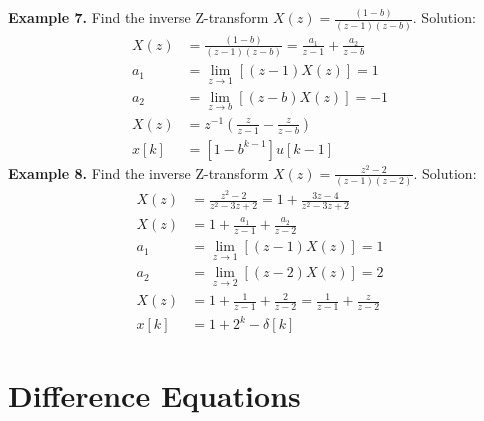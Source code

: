 \documentclass[twoside]{article}
\begin{document}
%
\textbf{Example 7.} Find the  inverse Z-transform $X(z) =
\frac{(1-b)}{(z-1) (z-b)}$. Solution:
%
\begin{align*}
    X(z) &= \frac{(1-b)}{(z-1) (z-b)} = \frac{a_1}{z-1} + 
                     \frac{a_2}{z-b} \\
    a_1 &= \lim_{z \to 1} \left[ (z - 1) X(z) \right] = 1 \\
    a_2 &= \lim_{z \to b} \left[ (z - b) X(z) \right] = -1 \\
   X(z) &= z^{-1} \left( \frac{z}{z-1} - \frac{z}{z-b} \right) \\
   x[k] &= [ 1 - b^{k-1} ] u[k-1]
\end{align*}
%
\textbf{Example 8.} Find the  inverse Z-transform $X(z) =
\frac{z^2 - 2}{(z-1) (z-2)}$. Solution:
%
\begin{align*}
X(z) &= \frac{z^2 - 2}{z^2 - 3 z + 2} = 1 + \frac{3z - 4}{z^2 - 3 z + 2}
\\
    X(z) &= 1 + \frac{a_1}{z-1} + \frac{a_2}{z-2} \\
    a_1 &= \lim_{z \to 1} \left[ (z -1) X(z) \right] = 1 \\
    a_2 &= \lim_{z \to 2} \left[ (z -2) X(z) \right] = 2 \\
   X(z) &= 1 +\frac{1}{z-1} + \frac{2}{z-2} = \frac{1}{z-1} +
          \frac{z}{z-2} \\
   x[k] &= 1 + 2^k - \delta[k] 
\end{align*}
%

\section{Difference Equations}
\end{document}
